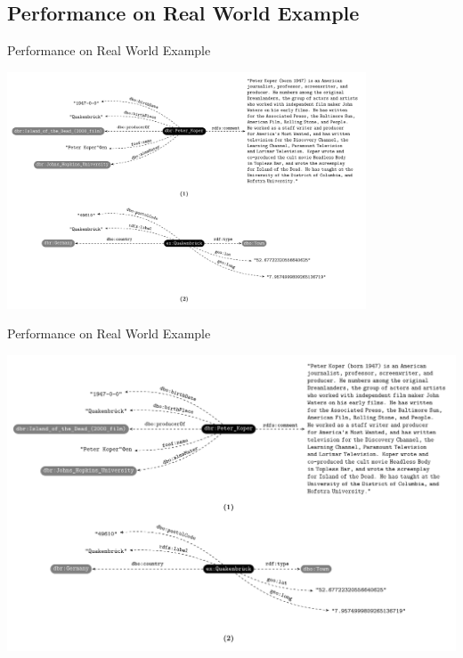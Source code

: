 \documentclass[aspectratio=1610,table]{beamer}
\begin{document}
\subsection{Performance on Real World Example}
\begin{frame}{Performance on Real World Example}
\begin{center}
  \includegraphics[page=1, width=0.8\textwidth]{gfx/img}
\end{center}
\end{frame}


\begin{frame}{Performance on Real World Example}
\begin{center}
    \includegraphics[page=2, width=\textwidth]{gfx/img}
\end{center}
\end{frame}
\end{document}
